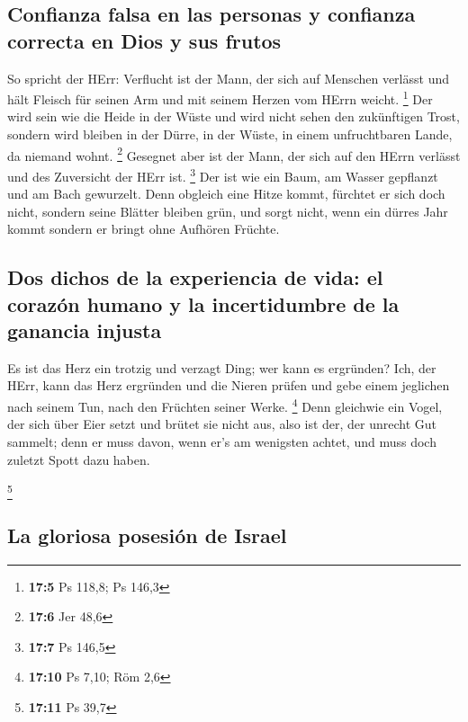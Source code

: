\hypertarget{confianza-falsa-en-las-personas-y-confianza-correcta-en-dios-y-sus-frutos}{%
\subsection{Confianza falsa en las personas y confianza correcta en Dios
y sus
frutos}\label{confianza-falsa-en-las-personas-y-confianza-correcta-en-dios-y-sus-frutos}}

 So spricht der HErr: Verflucht ist der Mann, der sich auf
Menschen verlässt und hält Fleisch für seinen Arm und mit seinem Herzen
vom HErrn weicht. \footnote{\textbf{17:5} Ps 118,8; Ps 146,3}
 Der wird sein wie die Heide in der Wüste und wird nicht
sehen den zukünftigen Trost, sondern wird bleiben in der Dürre, in der
Wüste, in einem unfruchtbaren Lande, da niemand wohnt. \footnote{\textbf{17:6}
  Jer 48,6}  Gesegnet aber ist der Mann, der sich auf den
HErrn verlässt und des Zuversicht der HErr ist. \footnote{\textbf{17:7}
  Ps 146,5}  Der ist wie ein Baum, am Wasser gepflanzt und
am Bach gewurzelt. Denn obgleich eine Hitze kommt, fürchtet er sich doch
nicht, sondern seine Blätter bleiben grün, und sorgt nicht, wenn ein
dürres Jahr kommt sondern er bringt ohne Aufhören Früchte.

\hypertarget{dos-dichos-de-la-experiencia-de-vida-el-corazuxf3n-humano-y-la-incertidumbre-de-la-ganancia-injusta}{%
\subsection{Dos dichos de la experiencia de vida: el corazón humano y la
incertidumbre de la ganancia
injusta}\label{dos-dichos-de-la-experiencia-de-vida-el-corazuxf3n-humano-y-la-incertidumbre-de-la-ganancia-injusta}}

 Es ist das Herz ein trotzig und verzagt Ding; wer kann es
ergründen?  Ich, der HErr, kann das Herz ergründen und
die Nieren prüfen und gebe einem jeglichen nach seinem Tun, nach den
Früchten seiner Werke. \footnote{\textbf{17:10} Ps 7,10; Röm 2,6}
 Denn gleichwie ein Vogel, der sich über Eier setzt und
brütet sie nicht aus, also ist der, der unrecht Gut sammelt; denn er
muss davon, wenn er's am wenigsten achtet, und muss doch zuletzt Spott
dazu haben.

\footnote{\textbf{17:11} Ps 39,7}

\hypertarget{la-gloriosa-posesiuxf3n-de-israel}{%
\subsection{La gloriosa posesión de
Israel}\label{la-gloriosa-posesiuxf3n-de-israel}}

